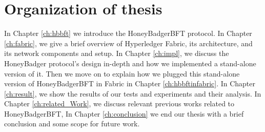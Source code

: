 \section{Organization of thesis}
In Chapter \ref{ch:hbbft} we  introduce the HoneyBadgerBFT protocol. In Chapter \ref{ch:fabric}, we give a brief overview of Hyperledger Fabric, its architecture, and its network components and setup. In Chapter \ref{ch:impl}, we discuss the HoneyBadger protocol's design in-depth and how we implemented a stand-alone version of it. Then we move on to explain how we plugged this stand-alone version of HoneyBadgerBFT in Fabric in Chapter \ref{ch:hbbftinfabric}. In Chapter \ref{ch:result}, we show the results of our tests and experiments and their analysis. In Chapter \ref{ch:related_Work}, we discuss relevant previous works related to HoneyBadgerBFT, In Chapter \ref{ch:conclusion} we end our thesis with a brief conclusion and some scope for future work.

